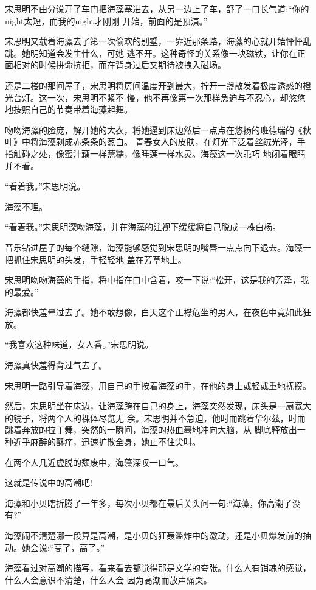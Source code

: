 \documentclass[11pt,a4paper,onecolumn]{article}
\begin{document}
宋思明不由分说开了车门把海藻塞进去，从另一边上了车，舒了一口长气道:``你的night太短，而我的night才刚刚
开始，前面的是预演。''

宋思明又载着海藻去了第一次偷欢的别墅，一靠近那条路，海藻的心就开始怦怦乱跳。她明知道会发生什么，可她
逃不开。这种奇怪的关系像一块磁铁，让你在正面相对的时候拼命抗拒，而在背身过后又期待被拽入磁场。

还是二楼的那间屋子，宋思明将房间温度开到最大，拧开一盏散发着极度诱惑的橙光台灯。这一次，宋思明不紧不
慢，他不再像第一次那样急迫与不忍心，却悠悠地按照自己的节奏带着海藻起舞。

吻吻海藻的脸庞，解开她的大衣，将她逼到床边然后一点点在悠扬的班德瑞的《秋叶》中将海藻剥成赤条条的葱白。
青春女人的皮肤，在灯光下泛着丝绒光泽，手指触碰之处，像蜜汁藕一样薷糯，像睡莲一样水灵。海藻这一次乖巧
地闭着眼睛并不看。

``看着我。''宋思明说。

海藻不理。

``看着我。''宋思明深吻海藻，并在海藻的注视下缓缓将自己脱成一株白杨。

音乐钻进屋子的每个缝隙，海藻能够感觉到宋思明的嘴唇一点点向下退去。海藻一把抓住宋思明的头发，手轻轻地
盖在芳草地上。

宋思明吻吻海藻的手指，将中指在口中含着，咬一下说:``松开，这是我的芳泽，我的最爱。''

海藻都快羞晕过去了。她不敢想像，白天这个正襟危坐的男人，在夜色中竟如此狂放。

``我喜欢这种味道，女人香。''宋思明说。

海藻真快羞得背过气去了。

宋思明一路引导着海藻，用自己的手按着海藻的手，在他的身上或轻或重地抚摸。

然后，宋思明坐在床边，让海藻跨在自己的身上，海藻突然发现，床头是一扇宽大的镜子，将两个人的裸体尽览无
余。宋思明并不急迫，他时而跳着华尔兹，时而跳着奔放的拉丁舞，突然的一瞬间，海藻的热血蓦地冲向大脑，从
脚底释放出一种近乎麻醉的酥痒，迅速扩散全身，她止不住尖叫。

在两个人几近虚脱的颓废中，海藻深叹一口气。

这就是传说中的高潮吧!

海藻和小贝瞎折腾了一年多，每次小贝都在最后关头问一句:``海藻，你高潮了没有?''

海藻闹不清楚哪一段算是高潮，是小贝的狂轰滥炸中的激动，还是小贝爆发前的抽动。她会说:``高了，高了。''

海藻看过对高潮的描写，看来看去都觉得那是文学的夸张。什么人有销魂的感觉，什么人会意识不清楚，什么人会
因为高潮而放声痛哭。
\end{document}
